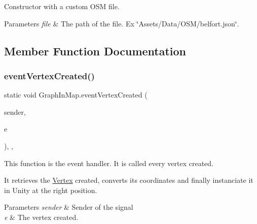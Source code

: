 Constructor with a custom O\+SM file. 


\begin{DoxyParams}{Parameters}
{\em file} & The path of the file. Ex \char`\"{}\+Assets/\+Data/\+O\+S\+M/belfort.\+json\char`\"{}.\\
\hline
\end{DoxyParams}


\subsection{Member Function Documentation}
\mbox{\label{classGraphInMap_a6fea7c15110ea78076b146139e2a30da}} 
\subsubsection{\texorpdfstring{event\+Vertex\+Created()}{eventVertexCreated()}}
{\footnotesize\ttfamily static void Graph\+In\+Map.\+event\+Vertex\+Created (\begin{DoxyParamCaption}\item[{object}]{sender,  }\item[{\hyperlink{classVertexCreateEventArgs}{Vertex\+Create\+Event\+Args}}]{e }\end{DoxyParamCaption})\hspace{0.3cm}{\ttfamily [inline]}, {\ttfamily [static]}, {\ttfamily [private]}}





This function is the event handler. It is called every vertex created. 

It retrieves the \hyperlink{structVertex}{Vertex} created, converts its coordinates and finally instanciate it in Unity at the right position. 


\begin{DoxyParams}{Parameters}
{\em sender} & Sender of the signal\\
\hline
{\em e} & The vertex created.\\
\hline
\end{DoxyParams}
\mbox{\label{classGraphInMap_a399e9c51b1492837c7d71b9a729a84ad}} 
